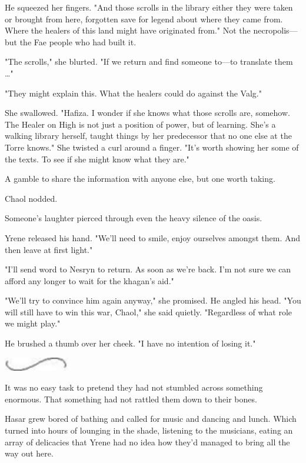 He squeezed her fingers. "And those scrolls in the library 
either they were taken or brought from here, forgotten save for legend about where they came from. Where the healers of this land might have originated from." Not the necropolis---but the Fae people who had built it.

"The scrolls," she blurted. "If we return and find someone to---to translate them \ldots"

"They might explain this. What the healers could do against the Valg."

She swallowed. "Hafiza. I wonder if she knows what those scrolls are, somehow. The Healer on High is not just a position of power, but of learning. She's a walking library herself, taught things by her predecessor that no one else at the Torre knows." She twisted a curl around a finger. "It's worth showing her some of the texts. To see if she might know what they are."

A gamble to share the information with anyone else, but one worth taking.

Chaol nodded.

Someone's laughter pierced through even the heavy silence of the oasis.

Yrene released his hand. "We'll need to smile, enjoy ourselves amongst them. And then leave at first light."

"I'll send word to Nesryn to return. As soon as we're back. I'm not sure we can afford any longer to wait for the khagan's aid."

"We'll try to convince him again anyway," she promised. He angled his head. "You will still have to win this war, Chaol," she said quietly. "Regardless of what role we might play."

He brushed a thumb over her cheek. "I have no intention of losing it."

\includegraphics[width=1.12in,height=0.24in]{images/seperator}

It was no easy task to pretend they had not stumbled across something enormous. That something had not rattled them down to their bones.

Hasar grew bored of bathing and called for music and dancing and lunch. Which turned into hours of lounging in the shade, listening to the musicians, eating an array of delicacies that Yrene had no idea how they'd managed to bring all the way out here.


